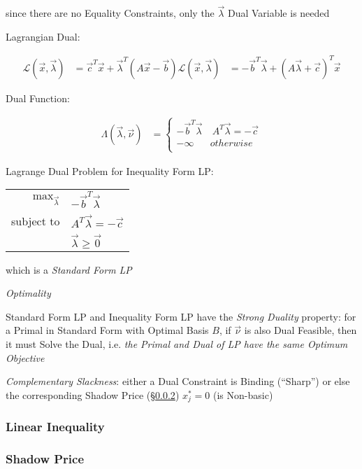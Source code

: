 since there are no Equality Constraints, only the $\vec{\lambda}$ Dual Variable
is needed

Lagrangian Dual:

\begin{align*}
  \mathcal{L}(\vec{x}, \vec{\lambda}) & =
    \vec{c}^T\vec{x} + \vec{\lambda}^T(A\vec{x} - \vec{b})
  \mathcal{L}(\vec{x}, \vec{\lambda}) & =
    -\vec{b}^T\vec{\lambda} + (A\vec{\lambda} + \vec{c})^T \vec{x}
\end{align*}

Dual Function:

\begin{align*}
  \Lambda(\vec{\lambda},\vec{\nu}) & = \begin{cases}
    -\vec{b}^T\vec{\lambda} & \ A^T\vec{\lambda} = -\vec{c} \\
    -\infty                 & otherwise \\
  \end{cases}
\end{align*}

Lagrange Dual Problem for Inequality Form LP:

\begin{tabular}{r l}
  $\mathrm{max}_{\vec{\lambda}}$ & $-\vec{b}^T\vec{\lambda}$ \\
  subject to & $A^T\vec{\lambda} = -\vec{c}$ \\
             & $\vec{\lambda} \geq \vec{0}$  \\
\end{tabular}

which is a \emph{Standard Form LP}


\emph{Optimality}

Standard Form LP and Inequality Form LP have the \emph{Strong Duality}
property: for a Primal in Standard Form with Optimal Basis $B$, if $\vec{\nu}$
is also Dual Feasible, then it must Solve the Dual, i.e. \emph{the Primal and
  Dual of LP have the same Optimum Objective}


\emph{Complementary Slackness}: either a Dual Constraint is Binding (``Sharp'')
or else the corresponding Shadow Price (\S\ref{sec:shadow_price}) $x_j^* = 0$
(is Non-basic)



\subsubsection{Linear Inequality}\label{sec:linear_inequality}

\subsubsection{Shadow Price}\label{sec:shadow_price}

